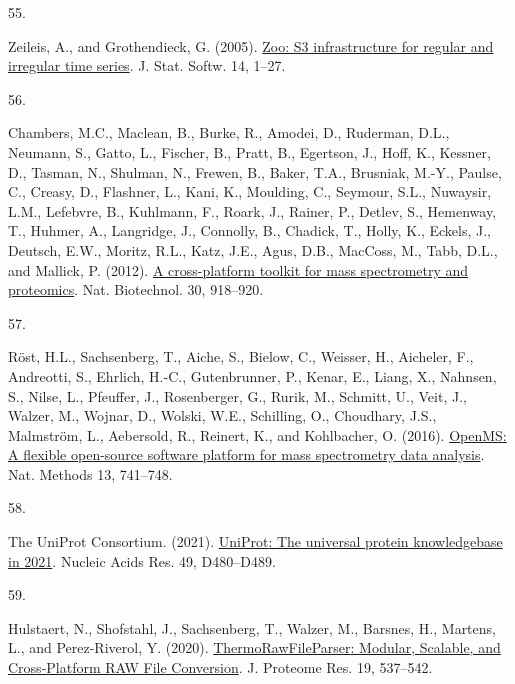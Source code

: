 \documentclass[
]{article}
\newlength{\cslhangindent}
\newlength{\csllabelwidth}
\newlength{\cslentryspacingunit} %
\newenvironment{CSLReferences}[2] %
 {%
  \setlength{\parindent}{0pt}
  \ifodd #1
  \let\oldpar\par
  \def\par{\hangindent=\cslhangindent\oldpar}
  \fi
  \setlength{\parskip}{#2\cslentryspacingunit}
 }%
 {}
\newcommand{\CSLLeftMargin}[1]{\parbox[t]{\csllabelwidth}{#1}}
\newcommand{\CSLRightInline}[1]{\parbox[t]{\linewidth - \csllabelwidth}{#1}\break}
\begin{document}
\begin{CSLReferences}{0}{0}
\leavevmode{}%
\CSLLeftMargin{55. }
\CSLRightInline{Zeileis, A., and Grothendieck, G. (2005). \href{https://doi.org/10.18637/jss.v014.i06}{Zoo: {S3} infrastructure for regular and irregular time series}. J. Stat. Softw. 14, 1--27.}

\leavevmode{}%
\CSLLeftMargin{56. }
\CSLRightInline{Chambers, M.C., Maclean, B., Burke, R., Amodei, D., Ruderman, D.L., Neumann, S., Gatto, L., Fischer, B., Pratt, B., Egertson, J., Hoff, K., Kessner, D., Tasman, N., Shulman, N., Frewen, B., Baker, T.A., Brusniak, M.-Y., Paulse, C., Creasy, D., Flashner, L., Kani, K., Moulding, C., Seymour, S.L., Nuwaysir, L.M., Lefebvre, B., Kuhlmann, F., Roark, J., Rainer, P., Detlev, S., Hemenway, T., Huhmer, A., Langridge, J., Connolly, B., Chadick, T., Holly, K., Eckels, J., Deutsch, E.W., Moritz, R.L., Katz, J.E., Agus, D.B., MacCoss, M., Tabb, D.L., and Mallick, P. (2012). \href{https://doi.org/10.1038/nbt.2377}{A cross-platform toolkit for mass spectrometry and proteomics}. Nat. Biotechnol. 30, 918--920.}

\leavevmode{}%
\CSLLeftMargin{57. }
\CSLRightInline{Röst, H.L., Sachsenberg, T., Aiche, S., Bielow, C., Weisser, H., Aicheler, F., Andreotti, S., Ehrlich, H.-C., Gutenbrunner, P., Kenar, E., Liang, X., Nahnsen, S., Nilse, L., Pfeuffer, J., Rosenberger, G., Rurik, M., Schmitt, U., Veit, J., Walzer, M., Wojnar, D., Wolski, W.E., Schilling, O., Choudhary, J.S., Malmström, L., Aebersold, R., Reinert, K., and Kohlbacher, O. (2016). \href{https://doi.org/10.1038/nmeth.3959}{{OpenMS}: A flexible open-source software platform for mass spectrometry data analysis}. Nat. Methods 13, 741--748.}

\leavevmode{}%
\CSLLeftMargin{58. }
\CSLRightInline{The UniProt Consortium. (2021). \href{https://doi.org/10.1093/nar/gkaa1100}{{UniProt}: The universal protein knowledgebase in 2021}. Nucleic Acids Res. 49, D480--D489.}

\leavevmode{}%
\CSLLeftMargin{59. }
\CSLRightInline{Hulstaert, N., Shofstahl, J., Sachsenberg, T., Walzer, M., Barsnes, H., Martens, L., and Perez-Riverol, Y. (2020). \href{https://doi.org/10.1021/acs.jproteome.9b00328}{{ThermoRawFileParser}: {Modular}, {Scalable}, and {Cross-Platform RAW File Conversion}}. J. Proteome Res. 19, 537--542.}


\end{CSLReferences}
\end{document}
